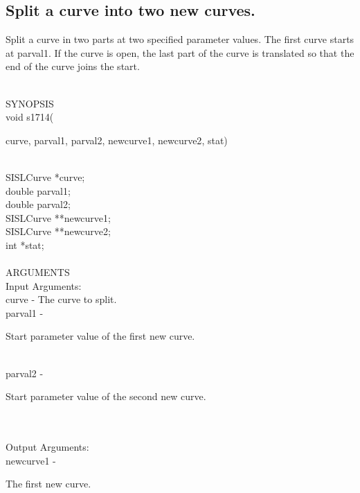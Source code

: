 \subsection{Split a curve into two new curves.}
\begin{minipg1}
  Split a curve in two parts at two specified parameter values. The
  first curve starts at {\fov parval1}. If the curve is open, the last
  part of the curve is translated so that the end of the curve joins the
  start.
\end{minipg1} \\
SYNOPSIS\\
        \>void s1714(\begin{minipg3}
        {\fov curve}, {\fov parval1}, {\fov parval2}, {\fov newcurve1}, {\fov newcurve2}, {\fov stat})
                \end{minipg3}\\[0.3ex]
                \>\>    SISLCurve       \>      *{\fov curve};\\
                \>\>    double  \>      {\fov parval1};\\
                \>\>    double  \>      {\fov parval2};\\
                \>\>    SISLCurve       \>      **{\fov newcurve1};\\
                \>\>    SISLCurve       \>      **{\fov newcurve2};\\
                \>\>    int     \>      *{\fov stat};\\
\\
ARGUMENTS\\
        \>Input Arguments:\\
        \>\>    {\fov curve}    \> - \> The curve to split.\\
        \>\>    {\fov parval1}  \> - \> \begin{minipg2}
                                Start parameter value of the first new curve.
                                \end{minipg2}\\
        \>\>    {\fov parval2}  \> - \> \begin{minipg2}
                                Start parameter value of the second new curve.
                                \end{minipg2}\\
\\
        \>Output Arguments:\\
        \>\>    {\fov newcurve1}\> - \>\begin{minipg2}
                                The first new curve.
                                \end{minipg2}\\
